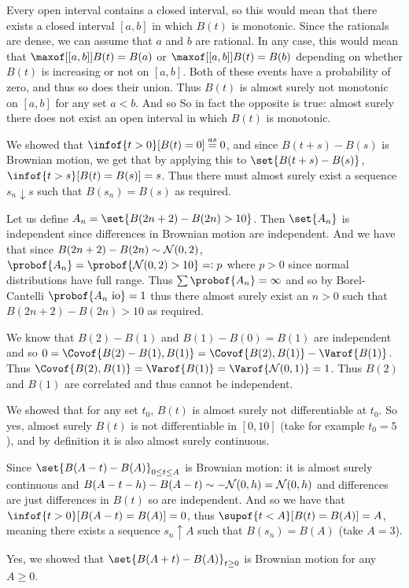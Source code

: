 \eexerc

\benum
    \item Every open interval contains a closed interval, so this would mean that there exists a closed interval $[a,b]$ in which $B(t)$ is monotonic.
    Since the rationals are dense, we can assume that $a$ and $b$ are rational.
    In any case, this would mean that $\maxof[{[a,b]}]B(t)=B(a)$ or $\maxof[{[a,b]}]B(t)=B(b)$ depending on whether $B(t)$ is increasing or not on $[a,b]$.
    Both of these events have a probability of zero, and thus so does their union.
    Thus $B(t)$ is almost surely not monotonic on $[a,b]$ for any set $a<b$.
    And so
    So in fact the opposite is true: almost surely there does not exist an open interval in which $B(t)$ is monotonic.
    \item We showed that $\infof{t>0}[B(t)=0]\buildrel as\over=0$, and since $B(t+s)-B(s)$ is Brownian motion, we get that by applying this to $\set{B(t+s)-B(s)}$, $\infof{t>s}[B(t)=B(s)]=s$.
    Thus there must almost surely exist a sequence $s_n\downarrow s$ such that $B(s_n)=B(s)$ as required.
    \item Let us define $A_n=\set{B(2n+2)-B(2n)>10}$.
    Then $\set{A_n}$ is independent since differences in Brownian motion are independent.
    And we have that since $B(2n+2)-B(2n)\sim{\cal N}(0,2)$, $\probof{A_n}=\probof{{\cal N}(0,2)>10}\eqqcolon p$ where $p>0$ since normal distributions have full range.
    Thus $\sum\probof{A_n}=\infty$ and so by Borel-Cantelli $\probof{A_n\hbox{ io}}=1$ thus there almost surely exist an $n>0$ such that $B(2n+2)-B(2n)>10$ as required.
    \item We know that $B(2)-B(1)$ and $B(1)-B(0)=B(1)$ are independent and so $0=\Covof{B(2)-B(1),B(1)}=\Covof{B(2),B(1)}-\Varof{B(1)}$.
    Thus $\Covof{B(2),B(1)}=\Varof{B(1)}=\Varof{{\cal N}(0,1)}=1$.
    Thus $B(2)$ and $B(1)$ are correlated and thus cannot be independent.
    \item We showed that for any set $t_0$, $B(t)$ is almost surely not differentiable at $t_0$.
    So yes, almost surely $B(t)$ is not differentiable in $[0,10]$ (take for example $t_0=5$), and by definition it is also almost surely continuous.
    \item Since $\set{B(A-t)-B(A)}_{0\leq t\leq A}$ is Brownian motion: it is almost surely continuous and $B(A-t-h)-B(A-t)\sim -{\cal N}(0,h)={\cal N}(0,h)$ and differences are just differences in $B(t)$
    so are independent.
    And so we have that $\infof{t>0}[B(A-t)=B(A)]=0$, thus $\supof{t<A}[B(t)=B(A)]=A$, meaning there exists a sequence $s_n\uparrow A$ such that $B(s_n)=B(A)$ (take $A=3$).
    \item Yes, we showed that $\set{B(A+t)-B(A)}_{t\geq0}$ is Brownian motion for any $A\geq0$.
\eenum

